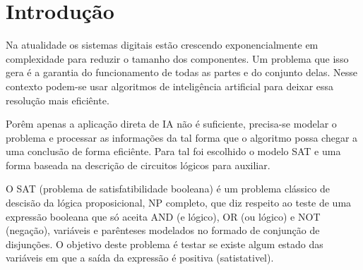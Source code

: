 \section{Introdução}
\label{sec:introducao}

Na atualidade os sistemas digitais estão crescendo exponencialmente em complexidade para reduzir o tamanho dos componentes. Um problema que isso gera é a garantia do funcionamento de todas as partes e do conjunto delas. Nesse contexto podem-se usar algoritmos de inteligência artificial para deixar essa resolução mais eficiênte.

Porêm apenas a aplicação direta de IA não é suficiente, precisa-se modelar o problema e processar as informações da tal forma que o algoritmo possa chegar a uma conclusão de forma eficiênte. Para tal foi escolhido o modelo SAT e uma forma baseada na descrição de circuitos lógicos para auxiliar. 

O SAT (problema de satisfatibilidade booleana) é um problema clássico de descisão da lógica proposicional, NP completo, que diz respeito ao teste de uma expressão booleana que só aceita AND (e lógico), OR (ou lógico) e NOT (negação), variáveis e parênteses modelados no formado de conjunção de disjunções. O objetivo deste problema é testar se existe algum estado das variáveis em que a saída da expressão é positiva (satistativel).

